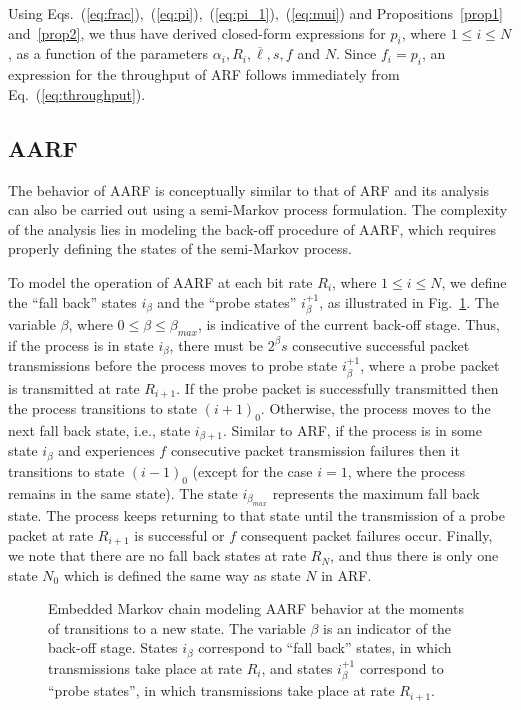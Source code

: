 \documentclass[11pt, journal, letterpaper, oneside, onecolumn]{IEEEtran}
\newcommand{\linegap}{1}
\begin{document}
Using
Eqs.~(\ref{eq:frac}),~(\ref{eq:pi}),~(\ref{eq:pi_1}),~(\ref{eq:mui})
and Propositions~\ref{prop1} and~\ref{prop2}, we thus have derived
closed-form expressions for $p_{i}$, where $1 \leq i \leq N$, as a
function of the parameters $\alpha_i, R_i,\overline{\ell}, s, f$
and $N$. Since $f_i=p_i$, an expression for the throughput of ARF
follows immediately from Eq.~(\ref{eq:throughput}).




\subsection{AARF}
\label{sec:AARF}

The behavior of AARF is conceptually similar to that of ARF and
its analysis can also be carried out using a semi-Markov process
formulation. The complexity of the analysis lies in modeling the
back-off procedure of AARF, which requires properly defining the
states of the semi-Markov process.






To model the operation of AARF at each bit rate $R_{i}$, where $1
\leq i \leq N$, we define the ``fall back'' states $i_{\beta}$ and
the ``probe states'' $i_{\beta}^{+1}$, as illustrated in
Fig.~\ref{fig:AARF-macro}. The variable $\beta$, where $0 \leq
\beta \leq \beta_{max}$, is indicative of the current back-off
stage. Thus, if the process is in state $i_{\beta}$, there must be
${2^\beta} s$ consecutive successful packet transmissions before
the process moves to probe state $i_{\beta}^{+1}$, where a probe
packet is transmitted at rate $R_{i+1}$. If the probe packet is
successfully transmitted then the process transitions to state
${(i+1)}_{0}$. Otherwise, the process moves to the next fall back
state, i.e., state $i_{\beta+1}$. Similar to ARF, if the process
is in some state $i_{\beta}$ and experiences $f$ consecutive
packet transmission failures then it transitions to state
${(i-1)}_{0}$ (except for the case $i=1$, where the process
remains in the same state). The state $i_{\beta_{max}}$ represents
the maximum fall back state. The process keeps returning to that
state until the transmission of a probe packet at rate $R_{i+1}$
is successful or $f$ consequent packet failures occur. Finally, we
note that there are no fall back states at rate $R_N$, and thus
there is only one state $N_0$ which is defined the same way as
state $N$ in ARF.

\begin{figure}[t]
\centering
{}
\caption{Embedded Markov chain modeling AARF behavior at the
moments of transitions to a new state. The variable $\beta$ is an
indicator of the back-off stage. States $i_\beta$ correspond to
``fall back'' states, in which transmissions take place at rate
$R_i$, and states $i^{+1}_\beta$ correspond to ``probe states'',
in which transmissions take place at rate $R_{i+1}$.}
\label{fig:AARF-macro}
\end{figure}\renewcommand{\baselinestretch}{\linegap}
\end{document}
